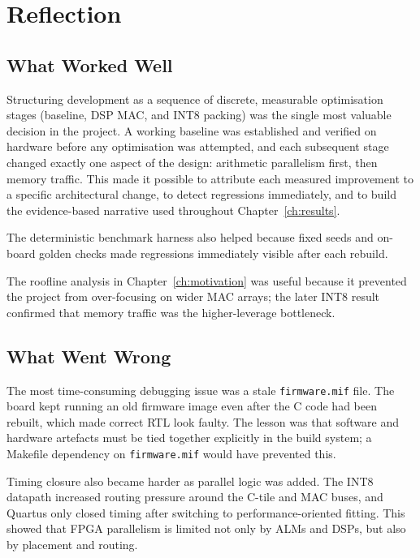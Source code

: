 \chapter{Reflection}
\label{ch:reflection}

\section{What Worked Well}

Structuring development as a sequence of discrete, measurable optimisation
stages (baseline, DSP MAC, and INT8 packing) was the single most valuable
decision in the project. A working baseline was established and verified on
hardware before any optimisation was attempted, and each subsequent stage
changed exactly one aspect of the design: arithmetic parallelism first, then
memory traffic. This made it possible to attribute each measured improvement
to a specific architectural change, to detect regressions immediately, and to
build the evidence-based narrative used throughout Chapter~\ref{ch:results}.

The deterministic benchmark harness also helped because fixed seeds and
on-board golden checks made regressions immediately visible after each
rebuild.

The roofline analysis in Chapter~\ref{ch:motivation} was useful because it
prevented the project from over-focusing on wider MAC arrays; the later INT8
result confirmed that memory traffic was the higher-leverage bottleneck.

\section{What Went Wrong}

The most time-consuming debugging issue was a stale \texttt{firmware.mif}
file. The board kept running an old firmware image even after the C code had
been rebuilt, which made correct RTL look faulty. The lesson was that software
and hardware artefacts must be tied together explicitly in the build system; a
Makefile dependency on \texttt{firmware.mif} would have prevented this.

Timing closure also became harder as parallel logic was added. The INT8
datapath increased routing pressure around the C-tile and MAC buses, and
Quartus only closed timing after switching to performance-oriented fitting.
This showed that FPGA parallelism is limited not only by ALMs and DSPs, but
also by placement and routing.

